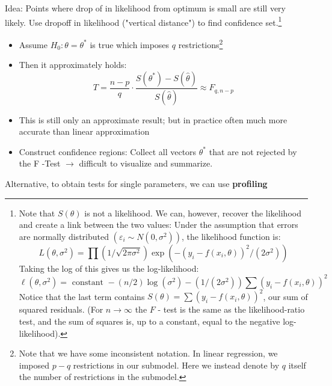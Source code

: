 \documentclass[11pt, %
	oneside, %
	english, %
	onehalfspacing, %
	]{article} %
\numberwithin{equation}{section}
\begin{document}
Idea: Points where drop of in likelihood from optimum is small are still very likely. Use dropoff in likelihood ("vertical distance") to find confidence set.\footnote{Note that $S(\theta)$ is not a likelihood. We can, however, recover the likelihood and create a link between the two values: Under the assumption that errors are normally distributed $\left(\varepsilon_i \sim N\left(0, \sigma^2\right)\right)$, the likelihood function is:
$$
L\left(\theta, \sigma^2\right)=\prod\left(1 /\sqrt{ 2 \pi \sigma^2}\right)  \exp \left(-\left(y_i-f\left(x_i, \theta\right)\right)^2 /\left(2 \sigma^2\right)\right)
$$
Taking the log of this gives us the log-likelihood:
$$
\ell\left(\theta, \sigma^2\right)=\text { constant }-(n / 2) \log \left(\sigma^2\right)-\left(1 /\left(2 \sigma^2\right)\right) \sum\left(y_i-f\left(x_i, \theta\right)\right)^2
$$
Notice that the last term contains $S(\theta)=\sum\left(y_i-f\left(x_i, \theta\right)\right)^2$, our sum of squared residuals. (For $n \rightarrow \infty$ the $F$ - test is the same as the likelihood-ratio test, and the sum of squares is, up to a constant, equal to the negative log-likelihood).}

\begin{itemize}
	\item Assume $H_0: \theta=\theta^*$ is true which imposes $q$ restrictions\footnote{Note that we have some inconsistent notation. In linear regression, we imposed $p-q$ restrictions in our submodel. Here we instead denote by $q$ itself the number of restrictions in the submodel.}
	\item Then it approximately holds:
    $$
    T=\frac{n-p}{q} \cdot \frac{S\left(\theta^*\right)-S(\hat{\theta})}{S(\hat{\theta})} \approx F_{q, n-p}
    $$
	\item This is still only an approximate result; but in practice often much more accurate than linear approximation
	\item Construct confidence regions: Collect all vectors $\theta^*$ that are not rejected by the F -Test $\to$ difficult to visualize and summarize.
\end{itemize}

Alternative, to obtain tests for single parameters, we can use \textbf{profiling}
\end{document}
